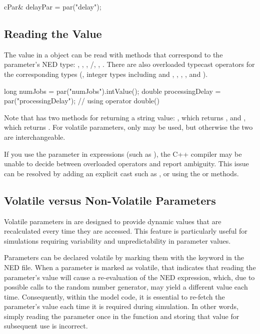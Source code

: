\begin{cpp}
cPar& delayPar = par("delay");
\end{cpp}


\subsection{Reading the Value}
\label{sec:simple-modules:parameters-reading}

The value in a  object can be read with methods that correspond to
the parameter's NED type: , ,
, /,
, . There are also overloaded typecast
operators for the corresponding types (, integer types including
 and , , , , and
).

\begin{cpp}
long numJobs = par("numJobs").intValue();
double processingDelay = par("processingDelay"); // using operator double()
\end{cpp}

Note that  has two methods for returning a string value:
, which returns , and
, which returns . For volatile
parameters, only  may be used, but otherwise the two are
interchangeable.

If you use the  parameter in expressions (such as
), the C++ compiler may be unable to decide between
overloaded operators and report ambiguity. This issue can be resolved by adding
an explicit cast such as , or using the
 or  methods.


\subsection{Volatile versus Non-Volatile Parameters}
\label{sec:simple-modules:volatile-parameters}

Volatile parameters in {\omnetpp} are designed to provide dynamic values that
are recalculated every time they are accessed. This feature is particularly
useful for simulations requiring variability and unpredictability in parameter
values.

Parameters can be declared volatile by marking them with the 
keyword in the NED file. When a parameter is marked as volatile, that indicates
that reading the parameter's value will cause a re-evaluation of the NED
expression, which, due to possible calls to the random number generator, may
yield a different value each time. Consequently, within the model code, it is
essential to re-fetch the parameter's value each time it is required during
simulation. In other words, simply reading the parameter once in the
 function and storing that value for subsequent use is
incorrect.

